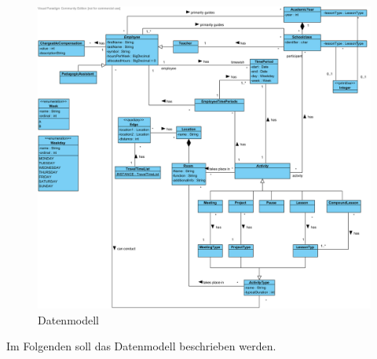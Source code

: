 \documentclass[fontsize=12pt,paper=a4,twoside]{scrartcl}
\begin{document}
\begin{figure}[H]
\includegraphics[width=\textwidth]{Datenmodell.png}
\caption{Datenmodell}
\end{figure}
Im Folgenden soll das Datenmodell beschrieben werden.\\
\end{document}
